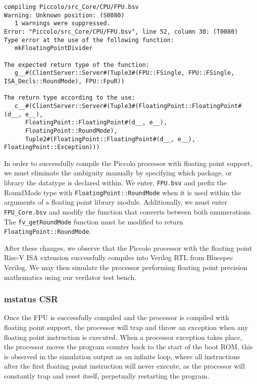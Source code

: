\documentclass[a4paper,8pt]{report}
\begin{document}
\begin{verbatim}
compiling Piccolo/src_Core/CPU/FPU.bsv
Warning: Unknown position: (S0080)
   1 warnings were suppressed.
Error: "Piccolo/src_Core/CPU/FPU.bsv", line 52, column 30: (T0080)
Type error at the use of the following function:
   mkFloatingPointDivider

The expected return type of the function:
   g__#(ClientServer::Server#(Tuple3#(FPU::FSingle, FPU::FSingle, ISA_Decls::RoundMode), FPU::FpuR))

The return type according to the use:
   c__#(ClientServer::Server#(Tuple3#(FloatingPoint::FloatingPoint#(d__, e__),
      FloatingPoint::FloatingPoint#(d__, e__),
      FloatingPoint::RoundMode),
      Tuple2#(FloatingPoint::FloatingPoint#(d__, e__), FloatingPoint::Exception)))
\end{verbatim}

In order to successfully compile the Piccolo processor with floating point
support, we must eliminate the ambiguity manually by specifying which package,
or library the datatype is declared within. We enter, \texttt{FPU.bsv} and prefix the
RoundMode type with \texttt{FloatingPoint::RoundMode} when it is used within the
arguments of a floating point library module. Additionally, we must enter
\texttt{FPU\_Core.bsv} and modify the function that converts between both
enumerations. The \texttt{fv\_getRoundMode} function must be modified to return
\texttt{FloatingPoint::RoundMode}.

After these changes, we observe that the Piccolo processor with the
floating point Risc-V ISA extension successfully compiles into Verilog RTL from
Bluespec Verilog. We may then simulate the processor performing floating point
precision mathematics using our verilator test bench.

\subsubsection{mstatus CSR}
Once the FPU is successfully compiled and the processor is compiled with
floating point support, the processor will trap and throw an exception when any
floating point instruction is executed. When a processor exception takes place,
the processor moves the program counter back to the start of the boot ROM, this
is observed in the simulation output as an infinite loop, where all instructions
after the first floating point instruction will never execute, as the processor
will constantly trap and reset itself, perpetually restarting the program.
\end{document}
